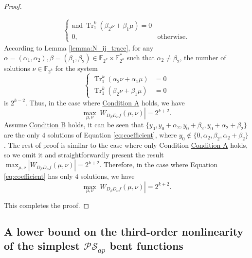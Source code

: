 \documentclass{article}
\newcommand{\F}{\mathbb{F}}
\newcommand{\0}{\textbf{0}}
\newcommand{\1}{\textbf{1}}
\newcommand{\TRACE}{\operatorname{Tr}_1^k}
\theoremstyle{plain}
\begin{document}
\begin{proof}
\begin{enumerate}[label=\textbf{Case \arabic*},wide = 0pt]
\begin{align}
\begin{cases}
                    \text{and}~\TRACE\left(\beta_2\nu+\beta_1 \mu\right)=0 \\
                    0,~&\text{otherwise}.
                \end{cases}
            \end{align}
            According to Lemma \ref{lemma:N_ij_trace}, for any $\alpha=(\alpha_1,\alpha_2),\beta=(\beta_1,\beta_2)\in\F_{2^k}\times\F_{2^k}^*$ such that $\alpha_2\ne\beta_2$, the number of solutions $\nu\in\F_{2^k}$ for the system
            \begin{equation}\label{eq:max_foursolution_condition}
                \left\{
                \begin{alignedat}{2}
                    \TRACE\left(\alpha_2\nu+\alpha_1\mu\right)&=0\\
                    \TRACE\left(\beta_2\nu +\beta_1 \mu\right)&=0
                \end{alignedat}
                \right.
            \end{equation}
            is $2^{k-2}$.
            Thus, in the case where \hyperref[item_a]{\textsf{Condition A}} holds, we have
            \[\max_{\mu,\nu}|W_{D_{\beta}D_{\alpha}f}(\mu,\nu)|=2^{k+2}.\]
            Assume \hyperref[item_b]{\textsf{Condition B}} holds,
            it can be seen that $\{y_0,y_0+\alpha_2,y_0+\beta_2,y_0+\alpha_2+\beta_2\}$
            are the only $4$ solutions of
            Equation \eqref{eq:coefficient}, where $y_0\notin\{0, \alpha_2, \beta_2, \alpha_2+\beta_2\}$.
            The rest of proof  is similar to the case where only Condition \hyperref[item_a]{\textsf{Condition A}} holds, so we omit it and
            straightforwardly present the result $\max_{\mu,\nu}|W_{D_{\beta}D_{\alpha}f}(\mu,\nu)|=2^{k+2}$.
            Therefore, in the case where Equation \eqref{eq:coefficient} has only $4$ solutions, we have
            \[\max_{\mu,\nu}|W_{D_{\beta}D_{\alpha}f}(\mu,\nu)|=2^{k+2}.\]
        \end{enumerate}
        This completes the proof.
    \end{proof}

\subsection{A lower bound on the third-order nonlinearity of the simplest $\mathcal{PS}_{ap}$ bent functions}
\end{document}
